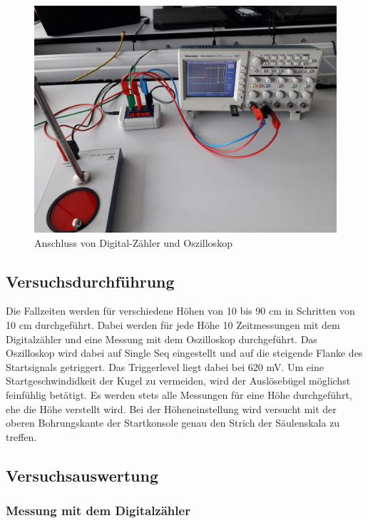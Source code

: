 \documentclass[a4paper, 12pt]{scrartcl}
\begin{document}
\begin{figure}[h]
	\centering
	\includegraphics{bilder/Aufbau_Detail_ff.jpg}
	\caption{Anschluss von Digital-Zähler und Oszilloskop}
	\label{AnschlussOsDz}
\end{figure}



\subsection{Versuchsdurchführung}

Die Fallzeiten werden für verschiedene Höhen von 10 bis 90 cm in Schritten von 10 cm durchgeführt. Dabei werden für jede Höhe 10 Zeitmessungen mit dem Digitalzähler und eine Messung mit dem Oszilloskop durchgeführt. Das Oszilloskop wird dabei auf Single Seq eingestellt und auf die steigende Flanke des Startsignals getriggert. Das Triggerlevel liegt dabei bei 620 mV. Um eine Startgeschwindidkeit der Kugel zu vermeiden, wird der Auslösebügel möglichst feinfühlig betätigt. Es werden stets alle Messungen für eine Höhe durchgeführt, ehe die Höhe verstellt wird. Bei der Höheneinstellung wird versucht mit der oberen Bohrungskante der Startkonsole genau den Strich der Säulenskala zu treffen.


\subsection{Versuchsauswertung}

\subsubsection{Messung mit dem Digitalzähler}
\end{document}
